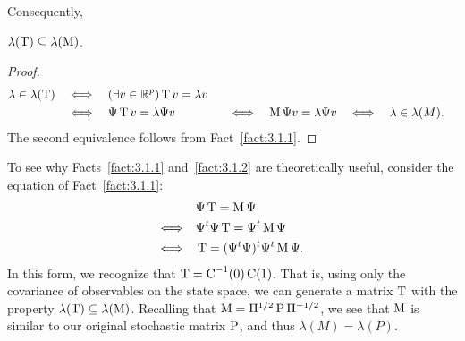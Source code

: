 Consequently,
\begin{fact}
\label{fact:3.1.2}
$\lambda(\T) \subseteq \lambda(\M)$.
\end{fact}
\begin{proof}
  \begin{align*}
\lambda \in \lambda(\T)
& \quad \Longleftrightarrow  \quad
(\exists v \in \R^p) \T v = \lambda v\\
& \quad \Longleftrightarrow  \quad
\Psi \T v = \lambda \Psi v
& \quad \Longleftrightarrow  \quad
\M \Psi v = \lambda \Psi v
& \quad \Longleftrightarrow  \quad
\lambda \in \lambda(M).
  \end{align*}
The second equivalence follows from Fact~\ref{fact:3.1.1}.  %
\end{proof}
To see why Facts~\ref{fact:3.1.1} and~\ref{fact:3.1.2} are theoretically useful,
consider the equation of Fact~\ref{fact:3.1.1}:
\begin{align*}
& \Psi \T = \M \Psi \\
\Longleftrightarrow \quad & \Psi^t\Psi \T = \Psi^t \M \Psi\\
\Longleftrightarrow \quad & \T = (\Psi^t\Psi)^t \Psi^t \M\Psi.
\end{align*}
In this form, we recognize that $\T = \C^{-1}(0)\C(1)$. That is, using only the
covariance of observables on the state space, we can generate a matrix $\T$ with
the property $\lambda(\T) \subseteq \lambda(\M)$. Recalling that 
$\M = \Pi^{1/2}\P\Pi^{-1/2}$, 
we see that $\M$ is similar to our original stochastic matrix $\P$, 
and thus $\lambda(M) = \lambda(P)$.

